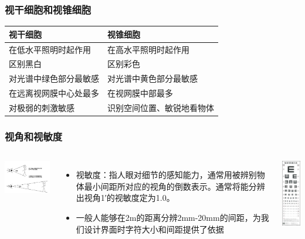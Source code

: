 \documentclass{beamer}
\begin{document}
\begin{frame}
	\frametitle{视干细胞和视锥细胞}
	\begin{tabular}[t]{p{4.5cm}|p{4.5cm}}
		\hline
		视干细胞 & 视锥细胞\\	\hline
		在低水平照明时起作用 & 在高水平照明时起作用\\\hline
		区别黑白 & 区别彩色\\	\hline
		对光谱中绿色部分最敏感 & 对光谱中黄色部分最敏感\\\hline
		在远离视网膜中心处最多 & 在视网膜中部最多\\\hline
		对极弱的刺激敏感 & 识别空间位置、敏锐地看物体\\\hline
	\end{tabular}
\end{frame}

\begin{frame}
	\frametitle{视角和视敏度}
	\beamertemplatetransparentcovereddynamicmedium
	\begin{columns}
		\column{7.5cm}
		\begin{center}
			\includegraphics[width=5cm]{images/viewport.png}
		\end{center}
		\begin{itemize}[<+->]
			\item 视敏度：{\tiny 指人眼对细节的感知能力，通常用被辨别物体最小间距所对应的视角的倒数表示。通常将能分辨出视角1′的视敏度定为1.0。}
			\item 一般人能够在2m的距离分辨2mm-20mm的间距，为我们设计界面时字符大小和间距提供了依据
		\end{itemize}
	\column{2.5cm}
	\includegraphics[width=2cm]{images/eye-chart.jpg}
	\end{columns}
\end{frame}
\end{document}
